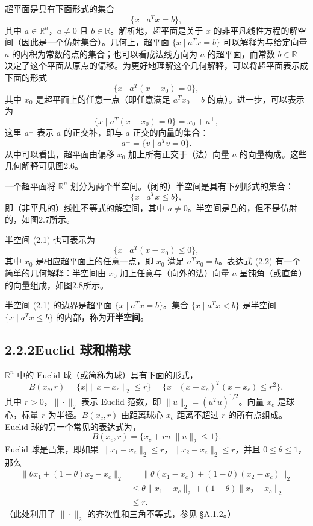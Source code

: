 \documentclass[UTF8, 12pt, fontset=fandol, oneside]{ctexart}
\begin{document}
超平面是具有下面形式的集合
\[
  \{x\mid a^Tx=b\},
\]
其中 $a\in\mathbb{R}^n$，$a\ne 0$ 且 $b\in\mathbb{R}$。解析地，超平面是关于 $x$ 的非平凡线性方程的解空间（因此是一个仿射集合）。几何上，超平面 $\{x\mid a^Tx=b\}$ 可以解释为与给定向量 $a$ 的内积为常数的点的集合；也可以看成法线方向为 $a$ 的超平面，而常数 $b\in\mathbb{R}$ 决定了这个平面从原点的偏移。为更好地理解这个几何解释，可以将超平面表示成下面的形式
\[
  \{x\mid a^T(x-x_0)=0\},
\]
其中 $x_0$ 是超平面上的任意一点（即任意满足 $a^Tx_0=b$ 的点）。进一步，可以表示为
\[
  \{x\mid a^T(x-x_0)=0\}=x_0+a^\perp,
\]
这里 $a^\perp$ 表示 $a$ 的正交补，即与 $a$ 正交的向量的集合：
\[
  a^\perp=\{v\mid a^Tv=0\}.
\]
从中可以看出，超平面由偏移 $x_0$ 加上所有正交于（法）向量 $a$ 的向量构成。这些几何解释可见图2.6。

一个超平面将 $\mathbb{R}^n$ 划分为两个半空间。（闭的）半空间是具有下列形式的集合：
\begin{equation}
  \{x\mid a^Tx\le b\},
  \tag{2.1}
\end{equation}
即（非平凡的）线性不等式的解空间，其中 $a\ne 0$。半空间是凸的，但不是仿射的，如图2.7所示。

半空间 (2.1) 也可表示为
\begin{equation}
  \{x\mid a^T(x-x_0)\le 0\},
  \tag{2.2}
\end{equation}
其中 $x_0$ 是相应超平面上的任意一点，即 $x_0$ 满足 $a^Tx_0=b$。表达式 (2.2) 有一个简单的几何解释：半空间由 $x_0$ 加上任意与（向外的法）向量 $a$ 呈钝角（或直角）的向量组成，如图2.8所示。

半空间 (2.1) 的边界是超平面 $\{x\mid a^Tx=b\}$。集合 $\{x\mid a^Tx<b\}$ 是半空间 $\{x\mid a^Tx\le b\}$ 的内部，称为\textbf{开半空间}。

\subsection*{2.2.2\quad Euclid 球和椭球}

$\mathbb{R}^n$ 中的 Euclid 球（或简称为球）具有下面的形式，
\[
  B(x_c,r)=\{x\mid \|x-x_c\|_2\le r\}
  =\{x\mid (x-x_c)^T(x-x_c)\le r^2\},
\]
其中 $r>0$，$\|\cdot\|_2$ 表示 Euclid 范数，即 $\|u\|_2=(u^Tu)^{1/2}$。向量 $x_c$ 是球心，标量 $r$ 为半径。$B(x_c,r)$ 由距离球心 $x_c$ 距离不超过 $r$ 的所有点组成。Euclid 球的另一个常见的表达式为，
\[
  B(x_c,r)=\{x_c+ru\mid \|u\|_2\le 1\}.
\]
Euclid 球是凸集，即如果 $\|x_1-x_c\|_2\le r$，$\|x_2-x_c\|_2\le r$，并且 $0\le\theta\le 1$，那么
\[
\begin{aligned}
  \|\theta x_1+(1-\theta)x_2-x_c\|_2
  &=\|\theta(x_1-x_c)+(1-\theta)(x_2-x_c)\|_2\\
  &\le \theta\|x_1-x_c\|_2+(1-\theta)\|x_2-x_c\|_2\\
  &\le r.
\end{aligned}
\]
（此处利用了 $\|\cdot\|_2$ 的齐次性和三角不等式，参见 §A.1.2。）
\end{document}
